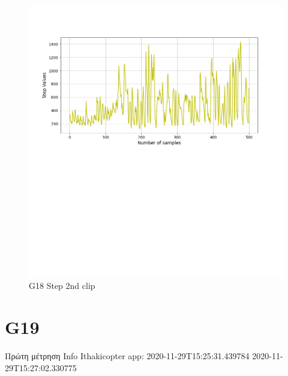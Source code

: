 \documentclass[hidelinks, 12pt, a4paper]{article}
\begin{document}
\begin{figure}[h!]
\centering
	\includegraphics[height=.38\textheight, width=\textwidth]{assets/session2/g18.png}
    \caption{G18 Step 2nd clip}
\end{figure}



\section{G19}
Πρώτη μέτρηση
Info Ithakicopter app:
2020-11-29T15:25:31.439784
2020-11-29T15:27:02.330775
\end{document}
